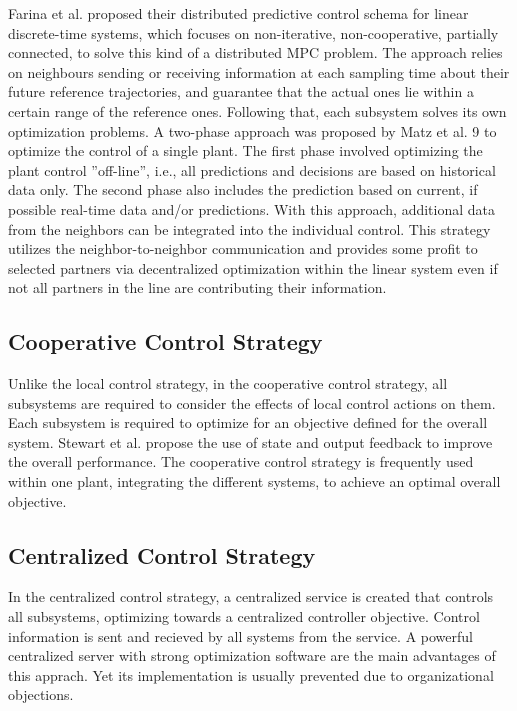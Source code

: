 Farina et al.\cite{farina2012distributed} proposed their distributed predictive control schema for linear discrete-time systems, which focuses on non-iterative, non-cooperative, partially connected, to solve this kind of a distributed MPC problem. The approach relies on neighbours sending or receiving information at each sampling time about their future reference trajectories, and guarantee that the actual ones lie within a certain range of the reference ones.\cite{SEIT2017} Following that, each subsystem solves its own optimization problems. A two-phase approach was proposed by Matz et al. 9 to optimize the control of a single plant. The first phase involved optimizing the plant control ”off-line”, i.e., all predictions and decisions are based on historical data only.\cite{SEIT2017} The second phase also includes the prediction based on current, if possible real-time data and/or predictions. With this approach, additional data from the neighbors can be integrated into the individual control. This strategy utilizes the neighbor-to-neighbor communication and provides some profit to selected partners via decentralized optimization within the linear system even if not all partners in the line are contributing their information.\cite{SEIT2017} 
\subsection{Cooperative Control Strategy}
Unlike the local control strategy, in the cooperative control strategy, all subsystems are required to consider the effects of local control actions on them. Each subsystem is required to optimize for an objective defined for the overall system. Stewart et al.\cite{stewart2010cooperative} propose the use of state and output feedback to improve the overall performance. The cooperative control strategy is frequently used within one plant, integrating the different systems, to achieve an optimal overall objective.\cite{SEIT2017,stewart2010cooperative}
\subsection{Centralized Control Strategy}
In the centralized control strategy, a centralized service is created that controls all subsystems, optimizing towards a centralized controller objective\cite{SEIT2017}. Control information is sent and recieved by all systems from the service. A powerful centralized server with strong optimization software are the main advantages of this apprach. Yet its implementation is usually prevented due to organizational objections.\cite{stewart2010cooperative}

